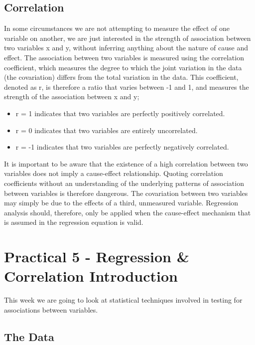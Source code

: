 \documentclass[
]{book}
\providecommand{\tightlist}{%
  \setlength{\itemsep}{0pt}\setlength{\parskip}{0pt}}
\begin{document}
\subsection*{Correlation}\label{correlation}

In some circumstances we are not attempting to measure the effect of one variable on another, we are just interested in the strength of association between two variables x and y, without inferring anything about the nature of cause and effect. The association between two variables is measured using the correlation coefficient, which measures the degree to which the joint variation in the data (the covariation) differs from the total variation in the data. This coefficient, denoted as r, is therefore a ratio that varies between -1 and 1, and measures the strength of the association between x and y;

\begin{itemize}
\tightlist
\item
  r = 1 indicates that two variables are perfectly positively correlated.
\item
  r = 0 indicates that two variables are entirely uncorrelated.
\item
  r = -1 indicates that two variables are perfectly negatively correlated.
\end{itemize}

It is important to be aware that the existence of a high correlation between two variables does not imply a cause-effect relationship. Quoting correlation coefficients without an understanding of the underlying patterns of association between variables is therefore dangerous. The covariation between two variables may simply be due to the effects of a third, unmeasured variable. Regression analysis should, therefore, only be applied when the cause-effect mechanism that is assumed in the regression equation is valid.

\section{Practical 5 - Regression \& Correlation Introduction}\label{practical-5---regression-correlation-introduction}

This week we are going to look at statistical techniques involved in testing for associations between variables.

\subsection{The Data}\label{the-data-2}
\end{document}
